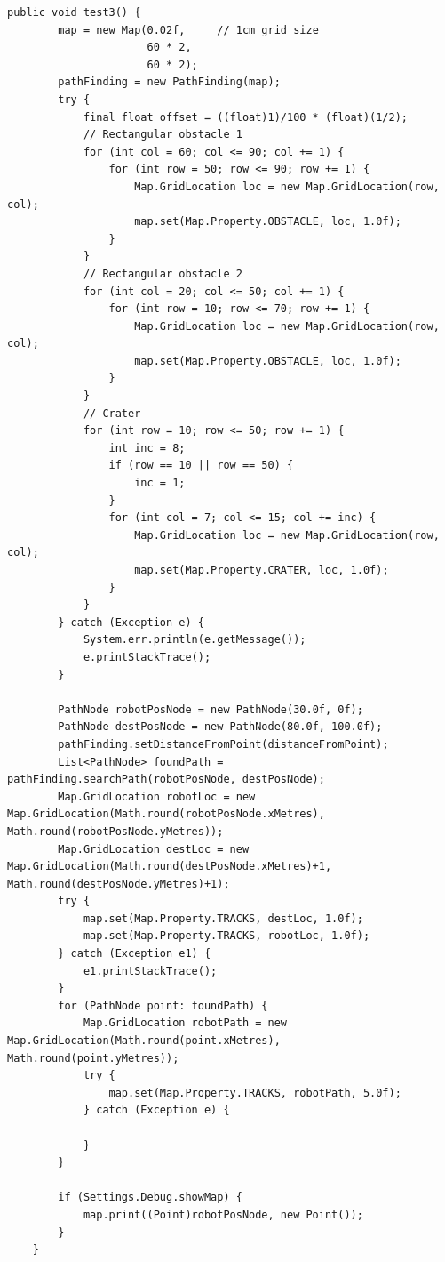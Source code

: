 \documentclass[12pt,a4paper]{article}
\begin{document}
    \begin{lstlisting}[caption=PathFinding automated test suite 3, captionpos=b, label={lst:PathFindingAutomatedTestSuite3}]
    public void test3() {
		map = new Map(0.02f,     // 1cm grid size
 			   		  60 * 2,    
 			   		  60 * 2);
		pathFinding = new PathFinding(map);
		try {
			final float offset = ((float)1)/100 * (float)(1/2);
			// Rectangular obstacle 1
			for (int col = 60; col <= 90; col += 1) {
				for (int row = 50; row <= 90; row += 1) {
					Map.GridLocation loc = new Map.GridLocation(row, col);
					map.set(Map.Property.OBSTACLE, loc, 1.0f);
				}
			}
			// Rectangular obstacle 2
			for (int col = 20; col <= 50; col += 1) {
				for (int row = 10; row <= 70; row += 1) {
					Map.GridLocation loc = new Map.GridLocation(row, col);
					map.set(Map.Property.OBSTACLE, loc, 1.0f);
				}
			}
			// Crater
			for (int row = 10; row <= 50; row += 1) {
				int inc = 8;
				if (row == 10 || row == 50) {
					inc = 1;
				}
				for (int col = 7; col <= 15; col += inc) {
					Map.GridLocation loc = new Map.GridLocation(row, col);
					map.set(Map.Property.CRATER, loc, 1.0f);
				}
			}
		} catch (Exception e) {
			System.err.println(e.getMessage());
			e.printStackTrace();
		}
		
		PathNode robotPosNode = new PathNode(30.0f, 0f);
		PathNode destPosNode = new PathNode(80.0f, 100.0f);
		pathFinding.setDistanceFromPoint(distanceFromPoint);
		List<PathNode> foundPath = pathFinding.searchPath(robotPosNode, destPosNode);
		Map.GridLocation robotLoc = new Map.GridLocation(Math.round(robotPosNode.xMetres), Math.round(robotPosNode.yMetres));
		Map.GridLocation destLoc = new Map.GridLocation(Math.round(destPosNode.xMetres)+1, Math.round(destPosNode.yMetres)+1);
		try {
			map.set(Map.Property.TRACKS, destLoc, 1.0f);
			map.set(Map.Property.TRACKS, robotLoc, 1.0f);
		} catch (Exception e1) {
			e1.printStackTrace();
		}
		for (PathNode point: foundPath) {
			Map.GridLocation robotPath = new Map.GridLocation(Math.round(point.xMetres), Math.round(point.yMetres));
			try {
				map.set(Map.Property.TRACKS, robotPath, 5.0f);
			} catch (Exception e) {
				
			}
		}
		
		if (Settings.Debug.showMap) {
			map.print((Point)robotPosNode, new Point());
		}
	}
     \end{lstlisting}
    
\end{document}

